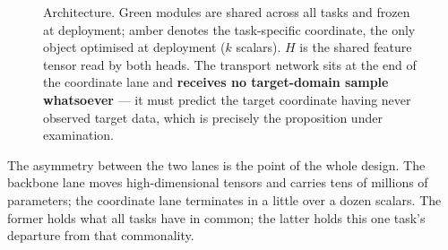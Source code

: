 \documentclass[11pt]{article}
\begin{document}
\begin{figure}[htbp]
{}

\caption{Architecture. Green modules are shared across all tasks and frozen at deployment; amber
denotes the task-specific coordinate, the only object optimised at deployment ($k$ scalars). $H$ is
the shared feature tensor read by both heads. The
transport network sits at the end of the coordinate lane and \textbf{receives no target-domain
sample whatsoever} --- it must predict the target coordinate having never observed target data,
which is precisely the proposition under examination.}
\label{fig:arch}
\end{figure}

The asymmetry between the two lanes is the point of the whole design. The backbone lane moves
high-dimensional tensors and carries tens of millions of parameters; the coordinate lane terminates
in a little over a dozen scalars. The former holds what all tasks have in common; the latter holds
this one task's departure from that commonality.
\end{document}
